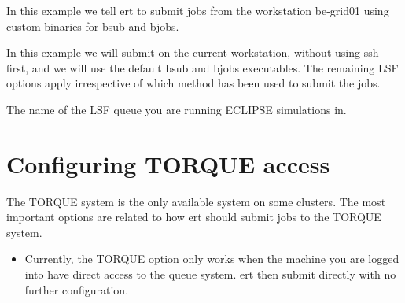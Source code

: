 \documentclass[a4paper,10pt,english]{sphinxmanual}
\begin{document}
\begin{sphinxShadowBox}
%
\begin{sphinxVerbatim}[commandchars=\\\{\}]
    
          
           
\end{sphinxVerbatim}

In this example we tell ert to submit jobs from the workstation be-grid01
using custom binaries for bsub and bjobs.


%
\begin{sphinxVerbatim}[commandchars=\\\{\}]
   
\end{sphinxVerbatim}

In this example we will submit on the current workstation, without using ssh
first, and we will use the default bsub and bjobs executables. The remaining
LSF options apply irrespective of which method has been used to submit the
jobs.
\end{sphinxShadowBox}
\label{\detokenize{keywords/index:lsf-queue}}
\begin{sphinxShadowBox}

The name of the LSF queue you are running ECLIPSE simulations in.
\end{sphinxShadowBox}


\section{Configuring TORQUE access}
\label{\detokenize{keywords/index:configuring-torque-access}}\label{\detokenize{keywords/index:id14}}
The TORQUE system is the only available system on some clusters. The most
important options are related to how ert should submit jobs to the TORQUE
system.
\begin{itemize}
\item {} 
Currently, the TORQUE option only works when the machine you are logged into
have direct access to the queue system. ert then submit directly with no
further configuration.

\end{itemize}
\end{document}
